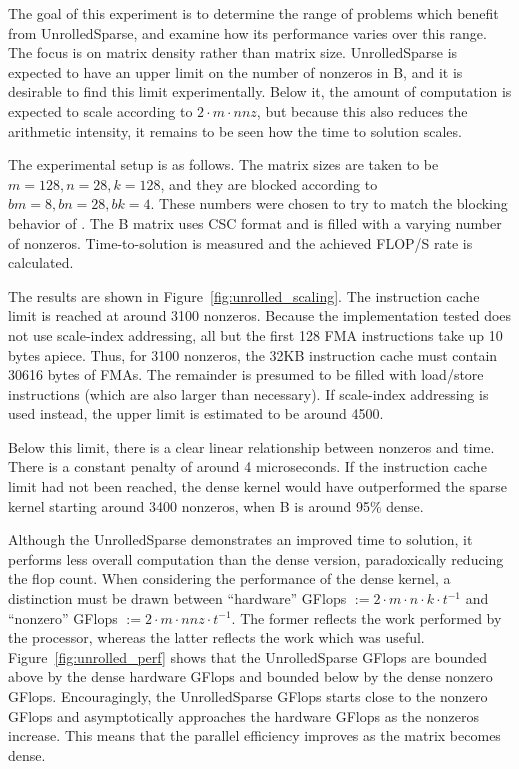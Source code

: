 The goal of this experiment is to determine the range of problems which benefit from UnrolledSparse, and examine how its performance varies over this range. The focus is on matrix density rather than matrix size. UnrolledSparse is expected to have an upper limit on the number of nonzeros in B, and it is desirable to find this limit experimentally. Below it, the amount of computation is expected to scale according to $2\cdot m \cdot nnz$, but because this also reduces the arithmetic intensity, it remains to be seen how the time to solution scales.

The experimental setup is as follows. The matrix sizes are taken to be $m=128, n=28, k=128$, and they are blocked according to $bm=8, bn=28, bk=4$. These numbers were chosen to try to match the blocking behavior of . The B matrix uses CSC format and is filled with a varying number of nonzeros. Time-to-solution is measured and the achieved FLOP/S rate is calculated.

The results are shown in Figure~\ref{fig:unrolled_scaling}. The instruction cache limit is reached at around 3100 nonzeros. Because the implementation tested does not use scale-index addressing, all but the first 128 FMA instructions take up 10 bytes apiece. Thus, for 3100 nonzeros, the 32KB instruction cache must contain 30616 bytes of FMAs. The remainder is presumed to be filled with load/store instructions (which are also larger than necessary). If scale-index addressing is used instead, the upper limit is estimated to be around 4500. 

Below this limit, there is a clear linear relationship between nonzeros and time. There is a constant penalty of around 4 microseconds. If the instruction cache limit had not been reached, the dense kernel would have outperformed the sparse kernel starting around 3400 nonzeros, when B is around 95\% dense.


Although the UnrolledSparse demonstrates an improved time to solution, it performs less overall computation than the dense version, paradoxically reducing the flop count. When considering the performance of the dense kernel, a distinction must be drawn between ``hardware'' GFlops $:= 2\cdot m \cdot n \cdot k \cdot t^{-1}$ and ``nonzero'' GFlops $:= 2 \cdot m \cdot nnz \cdot t^{-1}$. The former reflects the work performed by the processor, whereas the latter reflects the work which was useful. Figure~\ref{fig:unrolled_perf} shows that the UnrolledSparse GFlops are bounded above by the dense hardware GFlops and bounded below by the dense nonzero GFlops. Encouragingly, the UnrolledSparse GFlops starts close to the nonzero GFlops and asymptotically approaches the hardware GFlops as the nonzeros increase. This means that the parallel efficiency improves as the matrix becomes dense.


